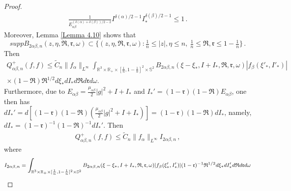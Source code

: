 \documentclass[reqno,11pt]{amsart}
\numberwithin{equation}{section}
\def\R{\mathbb{R}}
\begin{document}
\begin{proof}
\begin{equation*}
  \begin{aligned}
    \tfrac{1}{ E_{\alpha \beta}^{ ( \delta (\alpha) + \delta (\beta) ) /2 - 2 } } I^{ \delta ( \alpha ) / 2 - 1 } I_*^{ \delta ( \beta ) / 2 - 1 } \leq 1 \,.
  \end{aligned}
\end{equation*}
Moreover, Lemma \ref{Lemma 4.10} shows that 
$$supp B_{2\alpha \beta ,n} (z,\eta ,\mathfrak{R},\mathfrak{r},\omega) \subset \{(z,\eta ,\mathfrak{R},\mathfrak{r},\omega): \tfrac{1}{n}\leq |z|,\eta \leq n,\ \tfrac{1}{n} \leq \mathfrak{R},\mathfrak{r} \leq 1-\tfrac{1}{n}\} \,.$$ 
Then
\begin{equation*}
 \begin{aligned}
Q_{\alpha \beta, n}^+ (f,f) \leq \tilde{C}_n \| f_\alpha \|_{L^\infty} \int_{\R^3\times \R_+ \times [\frac{1}{n},1-\frac{1}{n}]^2 \times \mathbb{S}^2 } B_{2 \alpha \beta ,n}(\xi-\xi_*,I+I_*,\mathfrak{R},\mathfrak{r},\omega ) | f_{\beta}(\xi'_*,I'_*) | \\
\times (1-\mathfrak{R}) \mathfrak{R}^{1/2} d\xi_* dI_* d\mathfrak{R} d\mathfrak{r}d\omega.
 \end{aligned}   
\end{equation*}
Furthermore, due to $E_{\alpha \beta} = \frac{\mu_{\alpha \beta}}{2} |g|^2 + I + I_*$ and $I_*' = ( 1 - \mathfrak{r} ) ( 1 - \mathfrak{R} ) E_{\alpha \beta}$, one then has $d I_*' = d [ ( 1 - \mathfrak{r} ) ( 1 - \mathfrak{R} ) ( \frac{\mu_{\alpha \beta}}{2} |g|^2 + I + I_* ) ] = ( 1 - \mathfrak{r} ) ( 1 - \mathfrak{R} ) d I_* $, namely, $ d I_* = ( 1 - \mathfrak{r} )^{-1} ( 1 - \mathfrak{R} )^{-1} d I_*' $. Then
\begin{equation}\label{Q+-Linfty}
 \begin{aligned}
Q_{\alpha \beta, n}^+ (f,f) \leq \tilde{C}_n \| f_\alpha \|_{L^\infty} I_{2 \alpha \beta, n}\,,
 \end{aligned}   
\end{equation}
where
\begin{equation}\label{I-2abn}{\footnotesize
  \begin{aligned}
    I_{2 \alpha \beta, n} = \int_{\R^3\times \R_+ \times [\frac{1}{n},1-\frac{1}{n}]^2 \times \mathbb{S}^2 } B_{2 \alpha \beta ,n}(\xi-\xi_*,I+I_*,\mathfrak{R},\mathfrak{r},\omega ) | f_{\beta}(\xi'_*,I'_*) | (1-\mathfrak{r})^{-1} \mathfrak{R}^{1/2} d\xi_* dI_*' d\mathfrak{R} d\mathfrak{r}d\omega
  \end{aligned}}
\end{equation}


\end{proof}
\end{document}
